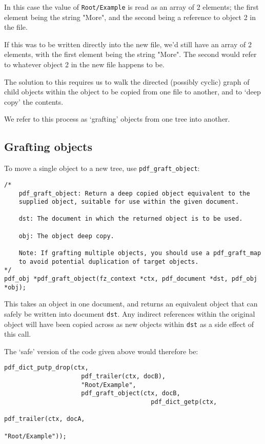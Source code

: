 \documentclass[oneside]{book}
\begin{document}
In this case the value of \texttt{Root/Example} is read as an array of 2 elements; the first element being the string "More", and the second being a reference to object 2 in the file.

If this was to be written directly into the new file, we'd still have an array of 2 elements, with the first element being the string "More". The second would refer to whatever object 2 in the new file happens to be.

The solution to this requires us to walk the directed (possibly cyclic) graph of child objects within the object to be copied from one file to another, and to `deep copy' the contents.

We refer to this process as `grafting' objects from one tree into another.

\subsection{Grafting objects}

To move a single object to a new tree, use \texttt{pdf\_graft\_object}:

\begin{lstlisting}
/*
	pdf_graft_object: Return a deep copied object equivalent to the
	supplied object, suitable for use within the given document.

	dst: The document in which the returned object is to be used.

	obj: The object deep copy.

	Note: If grafting multiple objects, you should use a pdf_graft_map
	to avoid potential duplication of target objects.
*/
pdf_obj *pdf_graft_object(fz_context *ctx, pdf_document *dst, pdf_obj *obj);
\end{lstlisting}

This takes an object in one document, and returns an equivalent object that can safely be written into document \texttt{dst}. Any indirect references within the original object will have been copied across as new objects within \texttt{dst} as a side effect of this call.

The `safe' version of the code given above would therefore be:

\begin{lstlisting}
pdf_dict_putp_drop(ctx,
                     pdf_trailer(ctx, docB),
                     "Root/Example",
                     pdf_graft_object(ctx, docB,
                                        pdf_dict_getp(ctx,
                                                        pdf_trailer(ctx, docA,
                                                        "Root/Example"));
\end{lstlisting}
\end{document}
